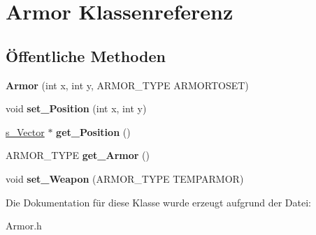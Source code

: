 \hypertarget{class_armor}{\section{Armor Klassenreferenz}
\label{class_armor}
}
\subsection*{Öffentliche Methoden}
\begin{DoxyCompactItemize}
\item 
\hypertarget{class_armor_ab9f3edb9b0fe736b82056fbfd6abe467}{{\bfseries Armor} (int x, int y, A\-R\-M\-O\-R\-\_\-\-T\-Y\-P\-E A\-R\-M\-O\-R\-T\-O\-S\-E\-T)}\label{class_armor_ab9f3edb9b0fe736b82056fbfd6abe467}

\item 
\hypertarget{class_armor_a007fd5929f7cd4c3ab062094c2465371}{void {\bfseries set\-\_\-\-Position} (int x, int y)}\label{class_armor_a007fd5929f7cd4c3ab062094c2465371}

\item 
\hypertarget{class_armor_aafd49a78e1d9de2ec03bdef3c5b7f454}{\hyperlink{structs___vector}{s\-\_\-\-Vector} $\ast$ {\bfseries get\-\_\-\-Position} ()}\label{class_armor_aafd49a78e1d9de2ec03bdef3c5b7f454}

\item 
\hypertarget{class_armor_a77760241405973937918be3377b2a02d}{A\-R\-M\-O\-R\-\_\-\-T\-Y\-P\-E {\bfseries get\-\_\-\-Armor} ()}\label{class_armor_a77760241405973937918be3377b2a02d}

\item 
\hypertarget{class_armor_a65b89fc0240f9d1f35daba631e3a0228}{void {\bfseries set\-\_\-\-Weapon} (A\-R\-M\-O\-R\-\_\-\-T\-Y\-P\-E T\-E\-M\-P\-A\-R\-M\-O\-R)}\label{class_armor_a65b89fc0240f9d1f35daba631e3a0228}

\end{DoxyCompactItemize}


Die Dokumentation für diese Klasse wurde erzeugt aufgrund der Datei\-:\begin{DoxyCompactItemize}
\item 
Armor.\-h\end{DoxyCompactItemize}
